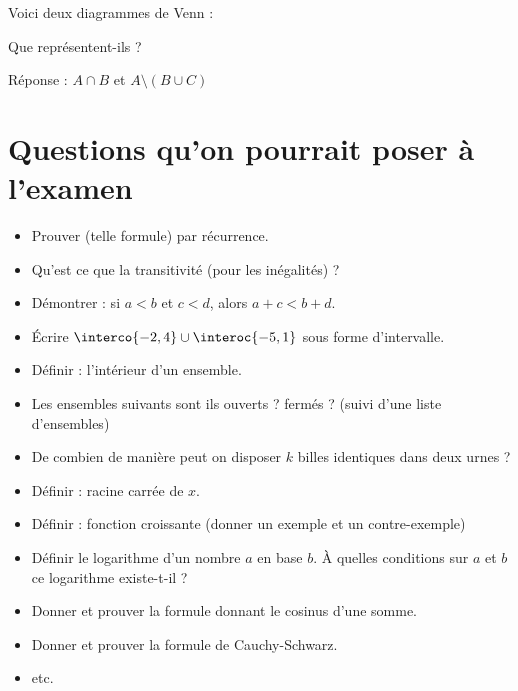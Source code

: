 \begin{frame}
  \begin{exercise} %
    Voici deux diagrammes de Venn :
    \begin{center}
      \raisebox{-.5\height}{\begin{venndiagram2sets}[shade=red] \fillACapB
        \end{venndiagram2sets}} \raisebox{-.5\height}{\begin{venndiagram3sets}[shade=green] \fillOnlyA
        \end{venndiagram3sets}}
    \end{center}
    Que représentent-ils ?
  \end{exercise}\pause{}

  Réponse : \(A \cap B\) et \(A\setminus (B\cup C)\)
\end{frame}

\section{Questions qu'on pourrait poser à l'examen}
\begin{frame} %
\begin{itemize}
\item Prouver (telle formule) par récurrence.
\item Qu'est ce que la transitivité (pour les inégalités) ?
\item Démontrer : si \(a < b\) et \(c < d\), alors \(a + c < b + d\).
\item Écrire \(\interco{-2,4}\cup \interoc{-5,1}\) sous forme d'intervalle.
\item Définir : l'intérieur d'un ensemble.
\item Les ensembles suivants sont ils ouverts ? fermés ? (suivi d'une liste d'ensembles)
\item De combien de manière peut on disposer \(k\) billes identiques dans deux urnes ?
\item Définir : racine carrée de \(x\).
\item Définir : fonction croissante (donner un exemple et un contre-exemple)
\item Définir le logarithme d'un nombre \(a\) en base \(b\). À quelles conditions sur \(a\) et \(b\) ce logarithme existe-t-il ?
\item Donner et prouver la formule donnant le cosinus d'une somme.
\item Donner et prouver la formule de Cauchy-Schwarz.
\item etc.
\end{itemize}
\end{frame}

